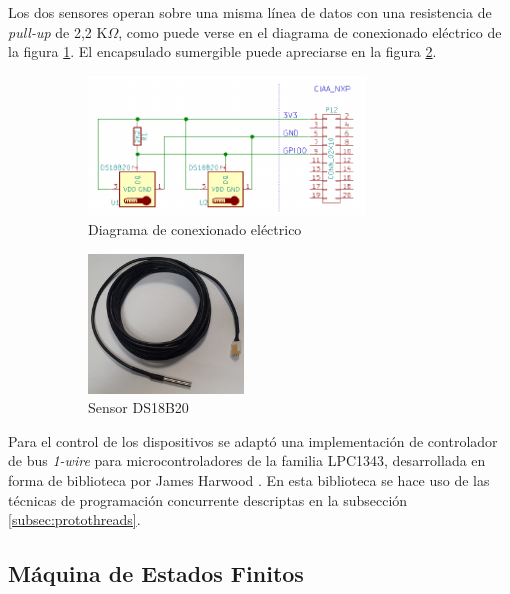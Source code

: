 Los dos sensores operan sobre una misma línea de datos con una resistencia de \textit{pull-up} de 2,2 K$\Omega$, como puede verse en el diagrama de conexionado eléctrico de la figura \ref{fig:ds18b20_conexionado}.  El encapsulado sumergible puede apreciarse en la figura \ref{fig:termometro}.


\begin{figure}[htpb]
	\centering
	\begin{subfigure}{.6\textwidth}
		\centering
		\includegraphics[height=3.7cm]{./Figures/ds18b20_conexionado.pdf}
		\caption{ Diagrama de conexionado eléctrico}
  		\label{fig:ds18b20_conexionado}
	\end{subfigure}%
	\begin{subfigure}{.4\textwidth}
		\centering
		\includegraphics[height=3.7cm]{./Figures/ds18b20.jpg}
		\caption{ Sensor DS18B20}
		\label{fig:termometro}
	\end{subfigure}
	\caption{}
	\label{fig:ds18b20}
\end{figure}


Para el control de los dispositivos se adaptó una implementación de controlador de bus \textit{1-wire} para microcontroladores de la familia LPC1343, desarrollada en forma de biblioteca por James Harwood \citep{harwood}.  En esta biblioteca se hace uso de las técnicas de programación concurrente descriptas en la subsección \ref{subsec:protothreads}.

\subsection{Máquina de Estados Finitos}

